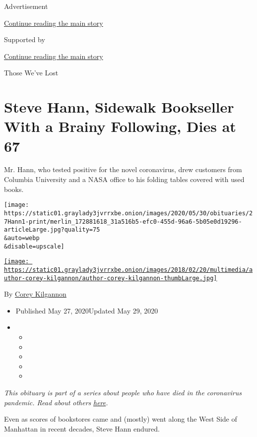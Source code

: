 Advertisement

\protect\hyperlink{after-top}{Continue reading the main story}

Supported by

\protect\hyperlink{after-sponsor}{Continue reading the main story}

Those We've Lost

\hypertarget{steve-hann-sidewalk-bookseller-with-a-brainy-following-dies-at-67}{%
\section{Steve Hann, Sidewalk Bookseller With a Brainy Following, Dies
at
67}\label{steve-hann-sidewalk-bookseller-with-a-brainy-following-dies-at-67}}

Mr. Hann, who tested positive for the novel coronavirus, drew customers
from Columbia University and a NASA office to his folding tables covered
with used books.

\texttt{[image: https://static01.graylady3jvrrxbe.onion/images/2020/05/30/obituaries/27Hann1-print/merlin\_172881618\_31a516b5-efc0-455d-96a6-5b05e0d19296-articleLarge.jpg?quality=75\\\&auto=webp\\\&disable=upscale]}

\href{https://www.nytimes3xbfgragh.onion/by/corey-kilgannon}{\texttt{[image: https://static01.graylady3jvrrxbe.onion/images/2018/02/20/multimedia/author-corey-kilgannon/author-corey-kilgannon-thumbLarge.jpg]}}

By \href{https://www.nytimes3xbfgragh.onion/by/corey-kilgannon}{Corey
Kilgannon}

\begin{itemize}
\item
  Published May 27, 2020Updated May 29, 2020
\item
  \begin{itemize}
  \item
  \item
  \item
  \item
  \item
  \end{itemize}
\end{itemize}

\emph{This obituary is part of a series about people who have died in
the coronavirus pandemic. Read about others}
\href{https://www.nytimes3xbfgragh.onion/interactive/2020/obituaries/people-died-coronavirus-obituaries.html}{\emph{here}}\emph{.}

Even as scores of bookstores came and (mostly) went along the West Side
of Manhattan in recent decades, Steve Hann endured.

